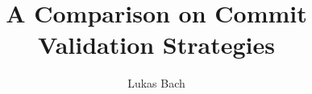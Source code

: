 \documentclass[twoside, english, draft]{sdqseminar}
\author{Lukas Bach}
\title{A Comparison on Commit Validation Strategies}
\begin{document}
\setpdf
\maketitle

\begin{abstract}

\end{abstract}




\printbibliography[heading=bibintoc]
\end{document}

